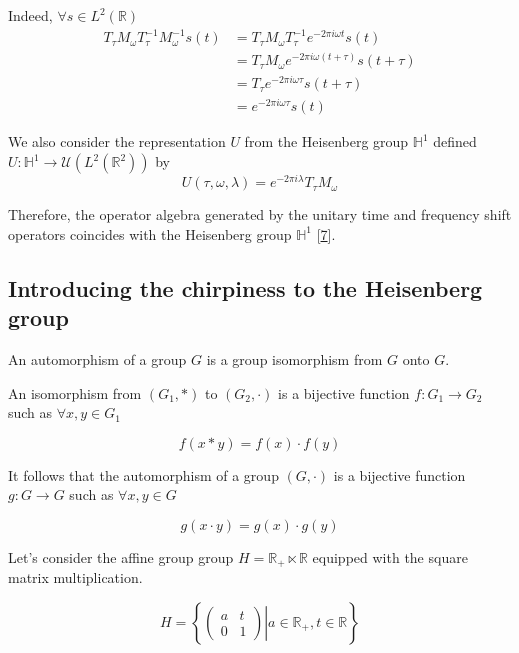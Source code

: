 \documentclass[
  american,
]{article}
\begin{document}
Indeed, \(\forall s\in L^2(\mathbb{R})\)
\begin{align*}
T_\tau M_\omega T_\tau^{-1} M_\omega^{-1} s(t)
&= T_\tau M_\omega T_\tau^{-1} e^{-2\pi i\omega t} s(t)\\ 
&= T_\tau M_\omega e^{-2\pi i\omega(t+\tau)} s(t+\tau)\\ 
&= T_\tau e^{-2\pi i\omega\tau} s(t+\tau)\\ 
&= e^{-2\pi i\omega\tau} s(t)
\end{align*}

We also consider the representation \(U\) from the Heisenberg group \(\mathbb{H}^1\)
defined \(U:\mathbb{H}^1\rightarrow\mathcal{U}(L^2(\mathbb{R}^2))\) by
\begin{equation}
U(\tau,\omega,\lambda) = e^{-2\pi i\lambda}T_\tau M_\omega
\end{equation}

Therefore, the operator algebra generated by the unitary time and frequency shift
operators coincides with the Heisenberg group \(\mathbb{H}^1\) {[}\protect\hyperlink{ref-boscain2021}{7}{]}.

\hypertarget{introducing-the-chirpiness-to-the-heisenberg-group}{%
\subsection{Introducing the chirpiness to the Heisenberg group}\label{introducing-the-chirpiness-to-the-heisenberg-group}}

An automorphism of a group \(G\) is a group isomorphism from \(G\) onto \(G\).

An isomorphism from \((G_1,*)\) to \((G_2,\cdot)\) is a bijective function
\(f:G_1\rightarrow G_2\) such as \(\forall x,y\in G_1\)

\begin{equation}
f(x*y) = f(x)\cdot f(y)
\end{equation}

It follows that the automorphism of a group \((G,\cdot)\) is a bijective function
\(g:G\rightarrow G\) such as \(\forall x,y\in G\)

\begin{equation}\label{eq:aut_g}
g(x\cdot y) = g(x)\cdot g(y)
\end{equation}

Let's consider the affine group group \(H=\mathbb{R}_+\ltimes\mathbb{R}\) equipped with the square matrix multiplication.

\begin{equation}
H = \left\{\left.\begin{pmatrix}a & t\\0 & 1\end{pmatrix}\right\vert a\in\mathbb{R}_+, t\in\mathbb{R}\right\}
\end{equation}
\end{document}
